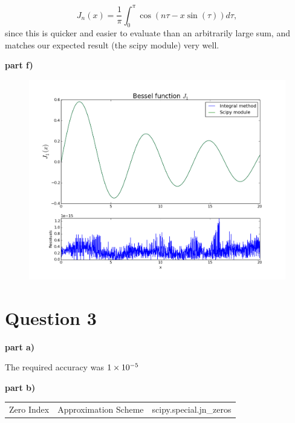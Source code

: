 \begin{equation}
J_n(x) = \frac{1}{\pi}\int_0^{\pi}\cos(n\tau - x\sin(\tau)) d\tau,\nonumber
\end{equation} 
%
since this is quicker and easier to evaluate than an arbitrarily large sum, and matches our expected result (the scipy module) very well.

\textbf{part f)}

\begin{figure}[H]
\centering
\includegraphics[width = \linewidth]{indepq2f.png}
\caption{}
\label{fig:q2f}
\end{figure}

\section{Question 3}

\textbf{part a)}

The required accuracy was $1\times 10^{-5}$

\textbf{part b)}

\begin{table}[H]
  \centering
  \begin{tabular}{|c||c||c|}
    \hline
    Zero Index & Approximation Scheme & scipy.special.jn\_zeros\\
  \end{tabular}
\end{table}


